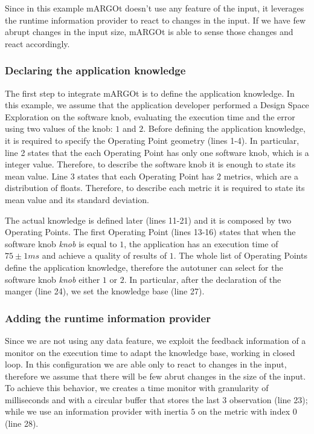 Since in this example mARGOt doesn't use any feature of the input, it leverages the runtime information provider to react to changes in the input.
If we have few abrupt changes in the input size, mARGOt is able to sense those changes and react accordingly.

\subsubsection*{Declaring the application knowledge}
The first step to integrate mARGOt is to define the application knowledge.
In this example, we assume that the application developer performed a Design Space Exploration on the software knob, evaluating the execution time and the error using two values of the knob: $1$ and $2$.
Before defining the application knowledge, it is required to specify the Operating Point geometry (lines 1-4).
In particular, line 2 states that the each Operating Point has only one software knob, which is a integer value.
Therefore, to describe the software knob it is enough to state its mean value.
Line 3 states that each Operating Point has 2 metrics, which are a distribution of floats.
Therefore, to describe each metric it is required to state its mean value and its standard deviation.

The actual knowledge is defined later (lines 11-21) and it is composed by two Operating Points.
The first Operating Point (lines 13-16) states that when the software knob \textit{knob} is equal to $1$, the application has an execution time of $75\pm1ms$ and achieve a quality of results of $1$.
The whole list of Operating Points define the application knowledge, therefore the autotuner can select for the software knob \textit{knob} either $1$ or $2$.
In particular, after the declaration of the manger (line 24), we set the knowledge base (line 27).

\subsubsection*{Adding the runtime information provider}

Since we are not using any data feature, we exploit the feedback information of a monitor on the execution time to adapt the knowledge base, working in closed loop.
In this configuration we are able only to react to changes in the input, therefore we assume that there will be few abrut changes in the size of the input.
To achieve this behavior, we creates a time monitor with granularity of milliseconds and with a circular buffer that stores the last 3 observation (line 23); while we use an information provider with inertia $5$ on the metric with index $0$ (line 28).

